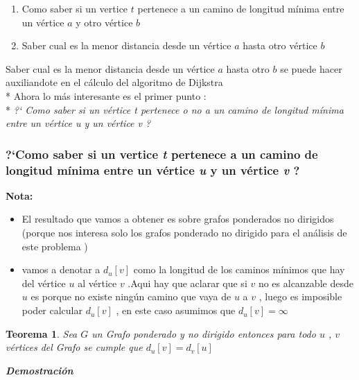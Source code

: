 \documentclass[10pt]{article}
\begin{document}
    \begin{enumerate}
        \item Como saber si un vertice $t$ pertenece a un camino de longitud m\'inima entre un v\'ertice $a$ y otro v\'ertice $b$ 
        \item Saber cual es la menor distancia desde un v\'ertice $a$ hasta otro v\'ertice $b$ 
    \end{enumerate}

    \noindent Saber cual es la menor distancia desde un v\'ertice $a$ hasta otro $b$ se puede hacer auxiliandote en el c\'alculo del algoritmo de Dijkstra 
    \\*
    Ahora lo m\'as interesante es el primer punto : 
    \\*
    \textit{ ?` Como saber si un v\'ertice t pertenece o no a un camino de longitud m\'inima entre un v\'ertice u y un v\'ertice v ?} 
    
    \subsubsection{?`Como saber si un vertice \textit{t} pertenece a un camino de longitud m\'inima entre un v\'ertice \textit{u} y un v\'ertice \textit{v} ?}
    
    \textbf{Nota:} 
    \begin{itemize}
        \item El resultado que vamos a obtener es sobre grafos ponderados no dirigidos  (porque nos interesa solo los grafos ponderado no dirigido para el an\'alisis de este problema  ) 
        \item vamos a denotar a $d_u\left[v\right]$ como la longitud de los caminos m\'inimos que hay del v\'ertice $u$ al v\'ertice  $v$ .Aqui hay que aclarar que si $v$ no es alcanzable desde $u$ es porque no existe ning\'un camino que vaya de $u$ a $v$ , luego es imposible poder calcular $d_u\left[v\right]$ , en este caso asumimos que $d_u\left[v\right] = \infty $
    \end{itemize}
    

    \newtheorem{thm}{Teorema}

    \begin{thm}
        Sea $G$ un Grafo ponderado y no dirigido entonces para todo $u$ , $v$ v\'ertices del Grafo  se cumple que $d_u\left[v\right] = d_v\left[u\right] $ 
    \end{thm}

    \noindent \textit{\textbf{Demostraci\'on}}
\end{document}

